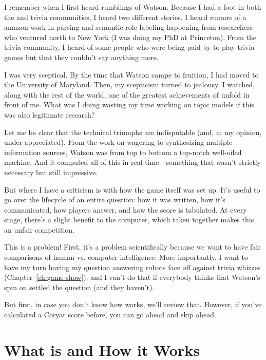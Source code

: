

I remember when I first heard rumblings of Watson.
%
Because I had a foot in both the  and trivia communities, I
heard two different stories.
%
I heard rumors of a amazon work in parsing and semantic role labeling
happening from researchers who ventured north to New York (I was doing
my PhD at Princeton).
%
From the trivia community, I heard of some people who were being paid
by  to play trivia games but that they couldn't say anything
more.

I was very sceptical.
%
By the time that Watson campe to fruition, I had moved to the
University of Maryland.
%
Then, my scepticism turned to jealousy.
%
I watched, along with the rest of the world, one of the greatest
achievements of  unfold in front of me.
%
What was I doing wasting my time working on topic models if this was
also legitimate research?

Let me be clear that the technical triumphs are indisputable (and, in
my opinion, under-appreciated).
%
From the work on wagering to synthesizing multiple information
sources, Watson was from top to bottom a top-notch well-oiled machine.
%
And it computed all of this in real time---something that wasn't
strictly necessary but still impressive.

But where I have a criticism is with how the game itself was set up.
%
It's useful to go over the lifecycle of an entire question: how it was
written, how it's communicated, how players answer, and how the score
is tabulated.
%
At every stage, there's a slight benefit to the computer, which taken
together makes this an unfair competition.

This is a problem!  First, it's a problem scientifically because we
want to have fair comparisons of human vs. computer intelligence.
%
More importantly, I want to have my turn having my question answering
robots face off against trivia whizzes (Chapter~\ref{ch:game-show}),
and I can't do that if everybody thinks that Watson's spin
on \jeopardy{} settled the question (and they haven't).


But first, in case you don't know how \jeopardy{} works, we'll review
that.
%
However, if you've calculated a Coryat score before, you can go ahead
and skip ahead.

\section{What \jeopardy{} is and How it Works}

